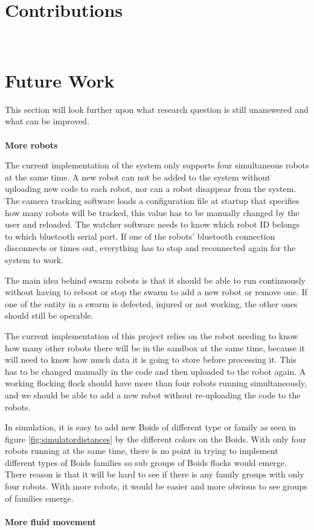 \section{Contributions}~\label{cont}
\label{sec:Contributions}





\section{Future Work}
\label{sec:futureWork}

This section will look further upon what research question is still unanswered and what can be improved.\\\\
\textbf{More robots}

The current implementation of the system only supports four simultaneous robots at the same time. A new robot can not be added to the system without uploading new code to each robot, nor can a robot disappear from the system. The camera tracking software loads a configuration file at startup that specifies how many robots will be tracked, this value has to be manually changed by the user and reloaded.
The watcher software needs to know which robot ID belongs to which bluetooth serial port. If one of the robots' bluetooth connection disconnects or times out, everything has to stop and reconnected again for the system to work.

The main idea behind swarm robots is that it should be able to run continuously without having to reboot or stop the swarm to add a new robot or remove one. If one of the entity in a swarm is defected, injured or not working, the other ones should still be operable.

The current implementation of this project relies on the robot needing to know how many other robots there will be in the sandbox at the same time, because it will need to know how much data it is going to store before processing it. This has to be changed manually in the code and then uploaded to the robot again.
A working flocking flock should have more than four robots running simultaneously, and we should be able to add a new robot without re-uploading the code to the robots.

In simulation, it is easy to add new Boids of different type or family as seen in figure \ref{fig:simulatordistances} by the different colors on the Boids. With only four robots running at the same time, there is no point in trying to implement different types of Boids families so sub groups of Boids flocks would emerge. There reason is that it will be hard to see if there is any family groups with only four robots. With more robots, it would be easier and more obvious to see groups of families emerge. \\\\
\textbf{More fluid movement}


